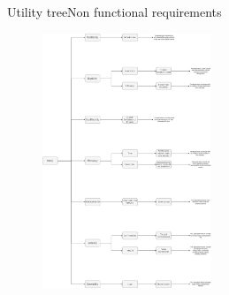 \documentclass[10pt]{beamer}
\begin{document}
\begin{frame}[fragile]{Utility tree}{Non functional requirements}
\begin{figure}
  \centering
  \includegraphics[width=0.45\textwidth]{UtilityTree.jpg}
\end{figure}
\end{frame}
\end{document}
